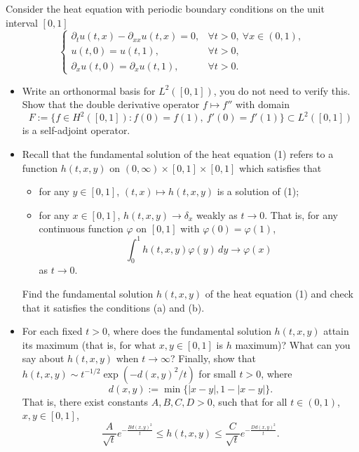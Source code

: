 \begin{exercise}
\label{analysis:2026:5}
Consider the heat equation with periodic boundary conditions on the unit interval $[0,1]$
\[
\begin{cases}
\partial_tu(t,x)-\partial_{xx}u(t,x)=0, & \forall t>0,\ \forall x\in(0,1),\\
u(t,0)=u(t,1), & \forall t>0,\\
\partial_xu(t,0)=\partial_xu(t,1), & \forall t>0.
\end{cases}
\tag{1}
\]
\begin{itemize}
\item[(1)] Write an orthonormal basis for $L^2([0,1])$, you do not need to verify this.  Show that the double derivative operator $f\mapsto f''$ with domain
\[
F:=\{f\in H^2([0,1]): f(0)=f(1),\ f'(0)=f'(1)\}\subset L^2([0,1])
\]
is a self-adjoint operator.
\item[(2)] Recall that the fundamental solution of the heat equation (1) refers to a function $h(t,x,y)$ on $(0,\infty)\times[0,1]\times[0,1]$ which satisfies that
\begin{itemize}
\item[(a)] for any $y\in[0,1]$, $(t,x)\mapsto h(t,x,y)$ is a solution of (1);
\item[(b)] for any $x\in[0,1]$, $h(t,x,y)\to\delta_x$ weakly as $t\to 0$.  That is, for any continuous function $\varphi$ on $[0,1]$ with $\varphi(0)=\varphi(1)$,
\[
\int_0^1h(t,x,y)\varphi(y)\,dy\to\varphi(x)
\]
as $t\to 0$.
\end{itemize}
Find the fundamental solution $h(t,x,y)$ of the heat equation (1) and check that it satisfies the conditions (a) and (b).
\item[(3)] For each fixed $t>0$, where does the fundamental solution $h(t,x,y)$ attain its maximum (that is, for what $x,y\in[0,1]$ is $h$ maximum)?  What can you say about $h(t,x,y)$ when $t\to\infty$?  Finally, show that $h(t,x,y)\sim t^{-1/2}\exp(-d(x,y)^2/t)$ for small $t>0$, where
\[
d(x,y):=\min\{|x-y|,1-|x-y|\}.
\]
That is, there exist constants $A,B,C,D>0$, such that for all $t\in(0,1)$, $x,y\in[0,1]$,
\[
\frac{A}{\sqrt{t}}e^{-\frac{Bd(x,y)^2}{t}}
\leq h(t,x,y)\leq
\frac{C}{\sqrt{t}}e^{-\frac{Dd(x,y)^2}{t}}.
\]
\end{itemize}
\end{exercise}

